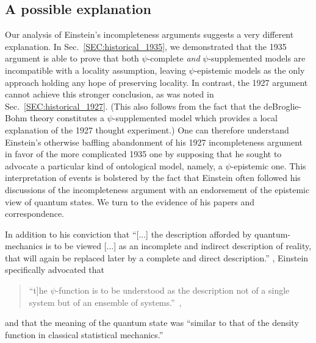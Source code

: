 \documentclass[aps,nofootinbib,12pt]{revtex4}
\begin{document}
\subsection{A possible explanation}
 Our analysis of Einstein's incompleteness arguments
suggests a very different explanation. In
Sec.~\ref{SEC:historical_1935}, we demonstrated that the 1935
argument is able to prove that both $\psi $-complete \textit{and}
$\psi$-supplemented models are incompatible with a locality
assumption, leaving $\psi$-epistemic models as the only approach
holding any hope of preserving locality. In contrast, the 1927
argument cannot achieve this stronger conclusion, as was noted in
Sec.~\ref{SEC:historical_1927}. (This also follows from the fact
that the deBroglie-Bohm theory constitutes a $\psi$-supplemented
model which provides a local explanation of the 1927 thought
experiment.) One can therefore understand Einstein's otherwise
baffling abandonment of his 1927 incompleteness argument in favor of
the more complicated 1935 one by supposing that he sought to
advocate a particular kind of ontological model, namely, a
$\psi$-epistemic one. This interpretation of events is bolstered by
the fact that Einstein often followed his discussions of the
incompleteness argument with an endorsement of the epistemic view of
quantum states. We turn to the evidence of his papers and
correspondence.

In addition to his conviction that ``[...] the description afforded
by quantum-mechanics is to be viewed [...] as an incomplete and
indirect description of reality, that will again be replaced later
by a complete and direct description.'' \cite{Edialectica}, Einstein
specifically advocated that
\begin{quote}
\textquotedblleft\lbrack t]he $\psi$-function is to be understood as
the description not of a single system but of an ensemble of
systems.\textquotedblright\ \cite{schilpp},
\end{quote}
and that the meaning of the quantum state was ``similar to that of
the density function in classical statistical
mechanics.''\cite{EtoBreit}
\end{document}
